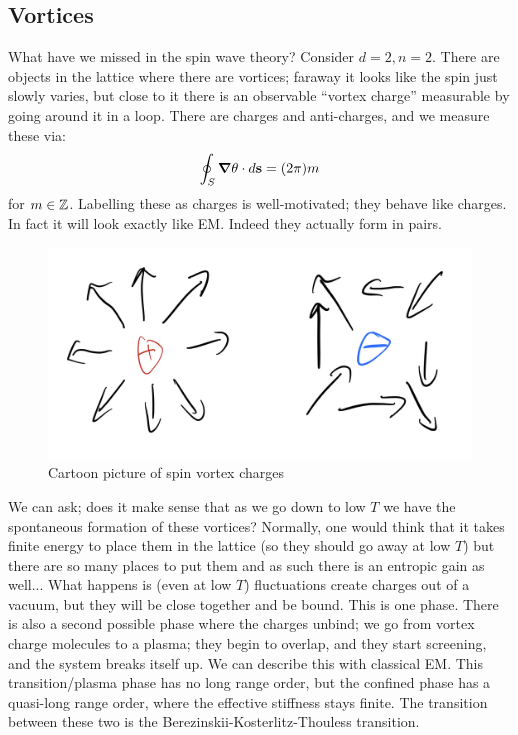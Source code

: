 \subsection{Vortices}
What have we missed in the spin wave theory? Consider $d = 2, n = 2$. There are objects in the lattice where there are vortices; faraway it looks like the spin just slowly varies, but close to it there is an observable ``vortex charge'' measurable by going around it in a loop. There are charges and anti-charges, and we measure these via:
\begin{equation}
    \oint_S \nabla \theta \cdot d\v{s} = (2\pi)m
\end{equation}
for $m \in \mathbb{Z}$. Labelling these as charges is well-motivated; they behave like charges. In fact it will look exactly like EM. Indeed they actually form in pairs.

\begin{figure}[htbp]
    \centering
    \includegraphics[scale=0.3]{Lectures/Figures/vortexcharges.png}
    \caption{Cartoon picture of spin vortex charges}
    \label{fig:vortexcharges}
\end{figure}

We can ask; does it make sense that as we go down to low $T$ we have the spontaneous formation of these vortices? Normally, one would think that it takes finite energy to place them in the lattice (so they should go away at low $T$) but there are so many places to put them and as such there is an entropic gain as well... What happens is (even at low $T$) fluctuations create charges out of a vacuum, but they will be close together and be bound. This is one phase. There is also a second possible phase where the charges unbind; we go from vortex charge molecules to a plasma; they begin to overlap, and they start screening, and the system breaks itself up. We can describe this with classical EM. This transition/plasma phase has no long range order, but the confined phase has a quasi-long range order, where the effective stiffness stays finite. The transition between these two is the Berezinskii-Kosterlitz-Thouless transition.